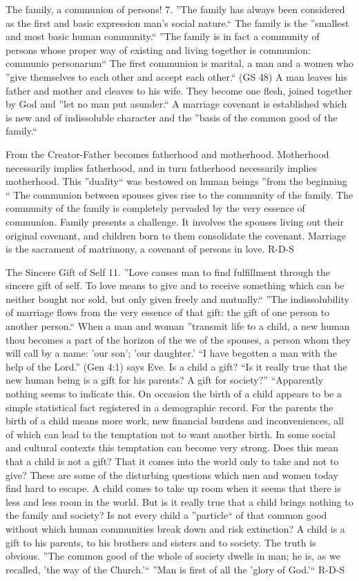 \documentclass[oneside]{book}
\begin{document}
The family, a communion of persons!
7. ''The family has always been considered as the first and basic expression
man's social nature.`` The family is the ''smallest and most basic human
community.`` ''The family is in fact a community of persons whose proper way of
existing and living together is communion: communio personarum`` The first
communion is marital, a man and a women who ''give themselves to each other and
accept each other.`` (GS 48) A man leaves his father and mother and cleaves to
his wife. They become one flesh, joined together by God and ''let no man put
asunder.`` A marriage covenant is established which is new and of indissoluble
character and the ''basis of the common good of the family.``

From the Creator-Father becomes fatherhood and motherhood. Motherhood
necessarily implies fatherhood, and in turn fatherhood necessarily implies
motherhood. This ''duality`` was bestowed on human beings ''from the beginning
`` The communion between spouses gives rise to the community of the family. The
community of the family is completely pervaded by the very essence of
communion. Family presents a challenge. It involves the spouses living out their
original covenant, and children born to them consolidate the covenant. Marriage
is the sacrament of matrimony, a covenant of persons in love.
R-D-S

The Sincere Gift of Self
11. ''Love causes man to find fulfillment through the sincere gift of self. To
love means to give and to receive something which can be neither bought nor
sold, but only given freely and mutually.`` ''The indissolubility of marriage
flows from the very essence of that gift: the gift of one person to another
person.`` When a man and woman ''transmit life to a child, a new human thou
becomes a part of the horizon of the we of the spouses, a person whom they will
call by a name: 'our son'; 'our daughter.' ``I have begotten a man with the help
of the Lord.'' (Gen 4:1) says Eve.
Is a child a gift? ``Is it really true that the new human being is a gift for
his parents? A gift for society?'' ``Apparently nothing seems to indicate
this. On occasion the birth of a child appears to be a simple statistical fact
registered in a demographic record. For the parents the birth of a child means
more work, new financial burdens and inconveniences, all of which can lead to
the temptation not to want another birth. In some social and cultural contexts
this temptation can become very strong. Does this mean that a child is not a
gift? That it comes into the world only to take and not to give? These are some
of the disturbing questions which men and women today find hard to escape. A
child comes to take up room when it seems that there is less and less room in
the world. But is it really true that a child brings nothing to the family and
society? Is not every child a ''particle`` of that common good without which
human communities break down and risk extinction? A child is a gift to his
parents, to his brothers and sisters and to society. The truth is obvious. ''The
common good of the whole of society dwells in man; he is, as we recalled, 'the
way of the Church.'`` ''Man is first of all the 'glory of God.'``
R-D-S
\end{document}
